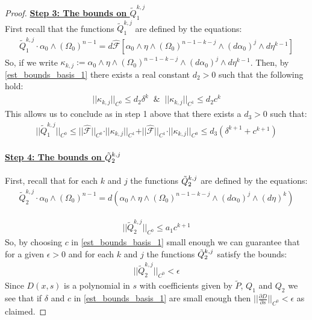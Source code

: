 \documentclass[11pt]{amsart}
\theoremstyle{plain}
\theoremstyle{definition}
\theoremstyle{remark}
\begin{document}
\begin{proof}
\textbf{\underline{Step 3: The bounds on $\tilde{Q}^{k,j}_1$}}
\\
First recall that the functions $\tilde{Q}^{k,j}_1$ are defined by the equations:
\begin{align}
         \tilde{Q}^{k,j}_1 \cdot \alpha_0 \wedge (\Omega_0)^{n-1} = d\hat{\mathcal{F}}[\alpha_0 \wedge \eta \wedge (\Omega_0)^{n-1-k-j} \wedge (d\alpha_0)^{j} \wedge d\eta^{k-1}]
\end{align}
So, if we write $\kappa_{k,j}:= \alpha_0 \wedge \eta \wedge (\Omega_0)^{n-1-k-j} \wedge (d\alpha_0)^{j} \wedge d\eta^{k-1}$. Then, by \eqref{est_bounds_basis_1} there exists a real constant $d_2>0$ such that the following hold:
\begin{align}
    \vert\vert\kappa_{k,j}\vert\vert_{C^0} \leq d_2 \delta^{k} \; \;  \& \;\; \vert\vert\kappa_{k,j}\vert\vert_{C^1} \leq d_2 c^{k}
\end{align}
This allows us to conclude as in step 1 above that there exists a $d_3>0$ such that:
\begin{align}
    \vert\vert\tilde{Q}^{k,j}_1\vert\vert_{C^0} \leq \vert\vert\hat{\mathcal{F}}\vert\vert_{C^0}\cdot \vert\vert\kappa_{k,j}\vert\vert_{C^1} + \vert\vert\hat{\mathcal{F}}\vert\vert_{C^1}\cdot \vert\vert\kappa_{k,j}\vert\vert_{C^0} \leq d_3(\delta^{k+1} + c^{k+1})
\end{align}
\\
\textbf{\underline{Step 4: The bounds on $\Tilde{Q}^{k,j}_2$}}
\\
\\
First, recall that for each $k$ and $j$ the functions $\Tilde{Q}^{k,j}_2$ are defined by the equations:
\begin{align}
        \tilde{Q}^{k,j}_2 \cdot \alpha_0 \wedge (\Omega_0)^{n-1} = d( \alpha_0 \wedge \eta  \wedge (\Omega_0)^{n-1-k-j} \wedge (d\alpha_0)^j \wedge  (d\eta)^{k})
    \end{align}

\begin{align}
    \vert\vert\tilde{Q}^{k,j}_2\vert\vert_{C^0} \leq a_1c^{k+1}
\end{align}
So, by choosing $c$ in \eqref{est_bounds_basis_1} small enough we can guarantee that for a given $\epsilon>0$ and for each $k$ and $j$ the functions $\Tilde{Q}^{k,j}_2$ satisfy the bounds:
\begin{align}
    \vert\vert\tilde{Q}^{k,j}_2\vert\vert_{C^0} < \epsilon
\end{align}
Since $D(x,s)$ is a polynomial in $s$ with coefficients given by $\tilde{P}$, $Q_1$ and $Q_2$ we see that if $\delta$ and $c$ in \eqref{est_bounds_basis_1} are small enough then $\vert\vert\frac{\partial D}{\partial s}\vert\vert_{C^0} < \epsilon$ as claimed. 
\end{proof}
\end{document}
